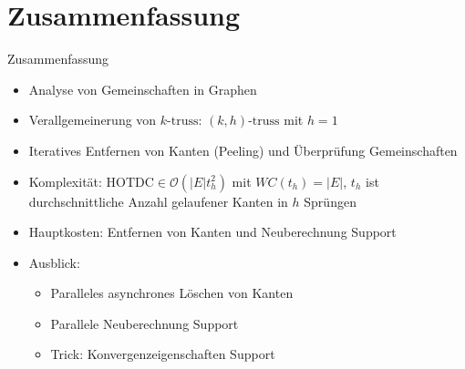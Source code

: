\section*{Zusammenfassung}

\begin{frame}{Zusammenfassung}
    \begin{itemize}
        \item Analyse von Gemeinschaften in Graphen
        \item Verallgemeinerung von $\text{$k$-truss}$: $\text{$(k,h)$-truss}$ mit $h=1$
        \item Iteratives Entfernen von Kanten (Peeling) und Überprüfung Gemeinschaften
        \item Komplexität: $\text{HOTDC} \in \mathcal{O}(\lvert E \rvert t_h^2)$ mit $WC(t_h) = \lvert E \rvert$, $t_h$ ist durchschnittliche Anzahl gelaufener Kanten in $h$ Sprüngen
        \item Hauptkosten: Entfernen von Kanten und Neuberechnung Support
        \item Ausblick:
        \begin{itemize}
            \item Paralleles asynchrones Löschen von Kanten
            \item Parallele Neuberechnung Support
            \item Trick: Konvergenzeigenschaften Support
        \end{itemize}
    \end{itemize}
\end{frame}

